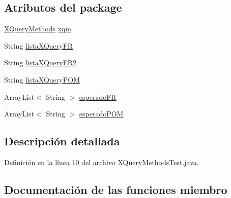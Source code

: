\subsection*{Atributos del \textquotesingle{}package\textquotesingle{}}
\begin{DoxyCompactItemize}
\item 
\mbox{\hyperlink{classedu_1_1ehu_1_1_c_s19_1_1_g_a_i_curricula_1_1_x_query_methods}{X\+Query\+Methods}} \mbox{\hyperlink{classedu_1_1ehu_1_1_c_s19_1_1_g_a_i_curricula_1_1_x_query_methods_test_a39a41e2d9871da80d3ac11ea85702ed3}{xqm}}
\item 
String \mbox{\hyperlink{classedu_1_1ehu_1_1_c_s19_1_1_g_a_i_curricula_1_1_x_query_methods_test_a716ee793e86b28484041d2ada3d13266}{lista\+X\+Query\+FR}}
\item 
String \mbox{\hyperlink{classedu_1_1ehu_1_1_c_s19_1_1_g_a_i_curricula_1_1_x_query_methods_test_abfdb5b674e64249ab393c5d71ccd9c9e}{lista\+X\+Query\+F\+R2}}
\item 
String \mbox{\hyperlink{classedu_1_1ehu_1_1_c_s19_1_1_g_a_i_curricula_1_1_x_query_methods_test_af899b7ca0c5c00c09a1265e7975c66a1}{lista\+X\+Query\+P\+OM}}
\item 
Array\+List$<$ String $>$ \mbox{\hyperlink{classedu_1_1ehu_1_1_c_s19_1_1_g_a_i_curricula_1_1_x_query_methods_test_aee6b73a3384d4b23a34648334a099b97}{esperado\+FR}}
\item 
Array\+List$<$ String $>$ \mbox{\hyperlink{classedu_1_1ehu_1_1_c_s19_1_1_g_a_i_curricula_1_1_x_query_methods_test_ab6d2fa743081f2227d9a4e00d9718458}{esperado\+P\+OM}}
\end{DoxyCompactItemize}


\subsection{Descripción detallada}


Definición en la línea 10 del archivo X\+Query\+Methods\+Test.\+java.



\subsection{Documentación de las funciones miembro}
\mbox{\label{classedu_1_1ehu_1_1_c_s19_1_1_g_a_i_curricula_1_1_x_query_methods_test_a9c391172ac7518b50fad0569a710d3e7}} 
